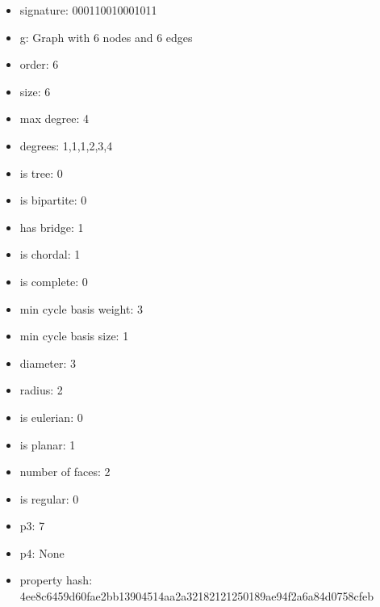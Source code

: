 \begin{itemize}
\item signature: 000110010001011
\item g: Graph with 6 nodes and 6 edges
\item order: 6
\item size: 6
\item max degree: 4
\item degrees: 1,1,1,2,3,4
\item is tree: 0
\item is bipartite: 0
\item has bridge: 1
\item is chordal: 1
\item is complete: 0
\item min cycle basis weight: 3
\item min cycle basis size: 1
\item diameter: 3
\item radius: 2
\item is eulerian: 0
\item is planar: 1
\item number of faces: 2
\item is regular: 0
\item p3: 7
\item p4: None
\item property hash: 4ee8c6459d60fae2bb13904514aa2a32182121250189ae94f2a6a84d0758cfeb
\end{itemize}
\newpage
\begin{figure}
\end{figure}
